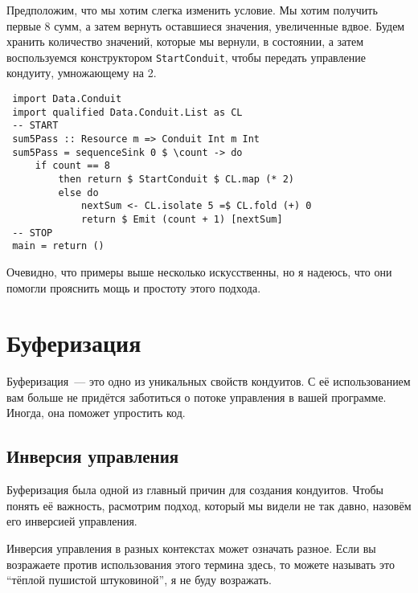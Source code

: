 {Предположим, что мы хотим слегка изменить условие. Мы хотим получить первые 8 сумм, а 
затем вернуть оставшиеся значения, увеличенные вдвое. Будем хранить количество значений, которые
мы вернули, в состоянии, а затем воспользуемся конструктором 
\lstinline'StartConduit', чтобы передать управление кондуиту, умножающему на 2.
\begin{lstlisting}
 import Data.Conduit
 import qualified Data.Conduit.List as CL
 -- START
 sum5Pass :: Resource m => Conduit Int m Int
 sum5Pass = sequenceSink 0 $ \count -> do
     if count == 8
         then return $ StartConduit $ CL.map (* 2)
         else do
             nextSum <- CL.isolate 5 =$ CL.fold (+) 0
             return $ Emit (count + 1) [nextSum]
 -- STOP
 main = return ()
\end{lstlisting}
Очевидно, что примеры выше несколько искусственны, но я надеюсь, что они
помогли прояснить мощь и простоту этого подхода. 
 
\section{Буферизация}

Буферизация~--- это одно из уникальных свойств кондуитов. С её использованием 
вам больше не придётся заботиться о потоке управления в вашей программе.
Иногда, она поможет упростить код.

\subsection{Инверсия управления}

Буферизация была одной из главный причин для создания кондуитов. Чтобы понять её 
важность, расмотрим подход, который мы видели не так давно, назовём его
инверсией управления.

\begin{remark}
Инверсия управления в разных контекстах может означать разное. Если вы возражаете 
против использования этого термина здесь, то можете называть это 
``тёплой пушистой штуковиной'', я не буду возражать.
\end{remark}

}
